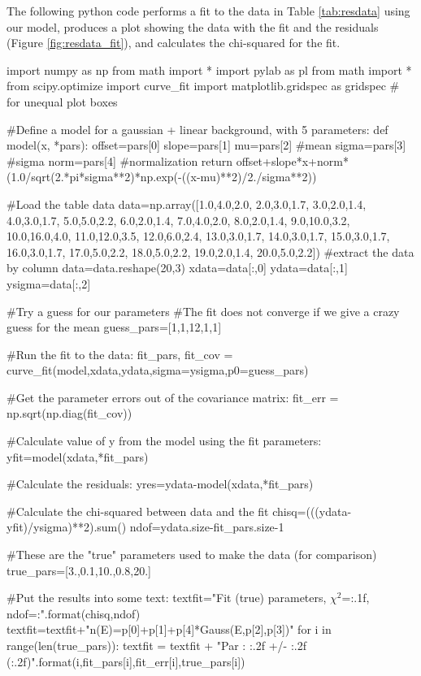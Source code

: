 The following python code performs a fit to the data in Table \ref{tab:resdata} using our model, produces a plot showing the data with the fit and the residuals (Figure \ref{fig:resdata_fit}), and calculates the chi-squared for the fit. 
\begin{python}[caption = Complete non-linear fit with residuals] 
import numpy as np
from math import *
import pylab as pl
from math import *
from scipy.optimize import curve_fit 
import matplotlib.gridspec as gridspec  # for unequal plot boxes

#Define a model for a gaussian + linear background, with 5 parameters:
def model(x, *pars):
    offset=pars[0]
    slope=pars[1]
    mu=pars[2] #mean
    sigma=pars[3] #sigma
    norm=pars[4] #normalization
    return offset+slope*x+norm*(1.0/sqrt(2.*pi*sigma**2)*np.exp(-((x-mu)**2)/2./sigma**2))
    
#Load the table data
data=np.array([1.0,4.0,2.0,
2.0,3.0,1.7,
3.0,2.0,1.4,
4.0,3.0,1.7,
5.0,5.0,2.2,
6.0,2.0,1.4,
7.0,4.0,2.0,
8.0,2.0,1.4,
9.0,10.0,3.2,
10.0,16.0,4.0,
11.0,12.0,3.5,
12.0,6.0,2.4,
13.0,3.0,1.7,
14.0,3.0,1.7,
15.0,3.0,1.7,
16.0,3.0,1.7,
17.0,5.0,2.2,
18.0,5.0,2.2,
19.0,2.0,1.4,
20.0,5.0,2.2])
#extract the data by column
data=data.reshape(20,3)
xdata=data[:,0]
ydata=data[:,1]
ysigma=data[:,2]

#Try a guess for our parameters
#The fit does not converge if we give a crazy guess for the mean
guess_pars=[1,1,12,1,1]

#Run the fit to the data:
fit_pars, fit_cov = curve_fit(model,xdata,ydata,sigma=ysigma,p0=guess_pars)

#Get the parameter errors out of the covariance matrix:
fit_err = np.sqrt(np.diag(fit_cov))

#Calculate value of y from the model using the fit parameters:    
yfit=model(xdata,*fit_pars)   

#Calculate the residuals:
yres=ydata-model(xdata,*fit_pars)

#Calculate the chi-squared between data and the fit
chisq=(((ydata-yfit)/ysigma)**2).sum()
ndof=ydata.size-fit_pars.size-1

#These are the "true" parameters used to make the data (for comparison)
true_pars=[3.,0.1,10.,0.8,20.]

#Put the results into some text:
textfit="Fit (true) parameters, $\chi^2$={:.1f}, ndof={}:\n".format(chisq,ndof)
textfit=textfit+"n(E)=p[0]+p[1]+p[4]*Gauss(E,p[2],p[3])\n"
for i in range(len(true_pars)):
    textfit = textfit + "Par {}: {:.2f} +/- {:.2f} ({:.2f})\n".format(i,fit_pars[i],fit_err[i],true_pars[i])


\end{python}
